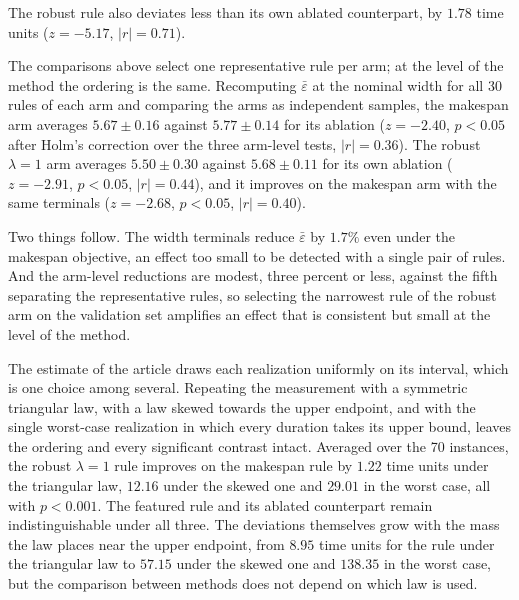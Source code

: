 \documentclass[11pt]{article}
\begin{document}
The robust rule also deviates less than its own ablated counterpart, by
$1.78$ time units ($z=-5.17$, $|r|=0.71$).

The comparisons above select one representative rule per arm; at the
level of the method the ordering is the same. Recomputing
$\bar\varepsilon$ at the nominal width for all 30 rules of each arm and
comparing the arms as independent samples, the makespan arm averages
$5.67 \pm 0.16$ against $5.77 \pm 0.14$ for its ablation ($z=-2.40$,
$p<0.05$ after Holm's correction over the three arm-level tests,
$|r|=0.36$). The robust $\lambda{=}1$ arm averages $5.50 \pm 0.30$
against $5.68 \pm 0.11$ for its own ablation ($z=-2.91$, $p<0.05$,
$|r|=0.44$), and it improves on the makespan arm with the same terminals
($z=-2.68$, $p<0.05$, $|r|=0.40$).

Two things follow. The width terminals reduce $\bar\varepsilon$ by
$1.7\%$ even under the makespan objective, an effect too small to be
detected with a single pair of rules. And the arm-level reductions are
modest, three percent or less, against the fifth separating the
representative rules, so selecting the narrowest rule of the robust arm
on the validation set amplifies an effect that is consistent but small
at the level of the method.

The estimate of the article draws each realization uniformly on its
interval, which is one choice among several. Repeating the measurement
with a symmetric triangular law, with a law skewed towards the upper
endpoint, and with the single worst-case realization in which every
duration takes its upper bound, leaves the ordering and every
significant contrast intact. Averaged over the 70 instances, the robust
$\lambda{=}1$ rule improves on the makespan rule by $1.22$ time units
under the triangular law, $12.16$ under the skewed one and $29.01$ in
the worst case, all with $p<0.001$. The featured rule and its ablated
counterpart remain indistinguishable under all three. The deviations themselves
grow with the mass the law places near the upper endpoint, from $8.95$
time units for the rule under the triangular law to $57.15$ under the
skewed one and $138.35$ in the worst case, but the comparison between
methods does not depend on which law is used.
\end{document}
